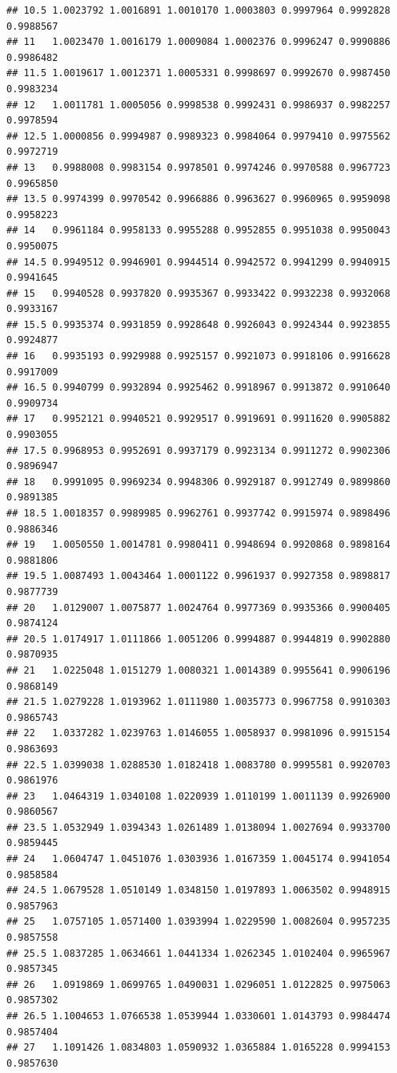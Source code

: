 \documentclass[
]{book}
\begin{document}
\begin{verbatim}
## 10.5 1.0023792 1.0016891 1.0010170 1.0003803 0.9997964 0.9992828 0.9988567
## 11   1.0023470 1.0016179 1.0009084 1.0002376 0.9996247 0.9990886 0.9986482
## 11.5 1.0019617 1.0012371 1.0005331 0.9998697 0.9992670 0.9987450 0.9983234
## 12   1.0011781 1.0005056 0.9998538 0.9992431 0.9986937 0.9982257 0.9978594
## 12.5 1.0000856 0.9994987 0.9989323 0.9984064 0.9979410 0.9975562 0.9972719
## 13   0.9988008 0.9983154 0.9978501 0.9974246 0.9970588 0.9967723 0.9965850
## 13.5 0.9974399 0.9970542 0.9966886 0.9963627 0.9960965 0.9959098 0.9958223
## 14   0.9961184 0.9958133 0.9955288 0.9952855 0.9951038 0.9950043 0.9950075
## 14.5 0.9949512 0.9946901 0.9944514 0.9942572 0.9941299 0.9940915 0.9941645
## 15   0.9940528 0.9937820 0.9935367 0.9933422 0.9932238 0.9932068 0.9933167
## 15.5 0.9935374 0.9931859 0.9928648 0.9926043 0.9924344 0.9923855 0.9924877
## 16   0.9935193 0.9929988 0.9925157 0.9921073 0.9918106 0.9916628 0.9917009
## 16.5 0.9940799 0.9932894 0.9925462 0.9918967 0.9913872 0.9910640 0.9909734
## 17   0.9952121 0.9940521 0.9929517 0.9919691 0.9911620 0.9905882 0.9903055
## 17.5 0.9968953 0.9952691 0.9937179 0.9923134 0.9911272 0.9902306 0.9896947
## 18   0.9991095 0.9969234 0.9948306 0.9929187 0.9912749 0.9899860 0.9891385
## 18.5 1.0018357 0.9989985 0.9962761 0.9937742 0.9915974 0.9898496 0.9886346
## 19   1.0050550 1.0014781 0.9980411 0.9948694 0.9920868 0.9898164 0.9881806
## 19.5 1.0087493 1.0043464 1.0001122 0.9961937 0.9927358 0.9898817 0.9877739
## 20   1.0129007 1.0075877 1.0024764 0.9977369 0.9935366 0.9900405 0.9874124
## 20.5 1.0174917 1.0111866 1.0051206 0.9994887 0.9944819 0.9902880 0.9870935
## 21   1.0225048 1.0151279 1.0080321 1.0014389 0.9955641 0.9906196 0.9868149
## 21.5 1.0279228 1.0193962 1.0111980 1.0035773 0.9967758 0.9910303 0.9865743
## 22   1.0337282 1.0239763 1.0146055 1.0058937 0.9981096 0.9915154 0.9863693
## 22.5 1.0399038 1.0288530 1.0182418 1.0083780 0.9995581 0.9920703 0.9861976
## 23   1.0464319 1.0340108 1.0220939 1.0110199 1.0011139 0.9926900 0.9860567
## 23.5 1.0532949 1.0394343 1.0261489 1.0138094 1.0027694 0.9933700 0.9859445
## 24   1.0604747 1.0451076 1.0303936 1.0167359 1.0045174 0.9941054 0.9858584
## 24.5 1.0679528 1.0510149 1.0348150 1.0197893 1.0063502 0.9948915 0.9857963
## 25   1.0757105 1.0571400 1.0393994 1.0229590 1.0082604 0.9957235 0.9857558
## 25.5 1.0837285 1.0634661 1.0441334 1.0262345 1.0102404 0.9965967 0.9857345
## 26   1.0919869 1.0699765 1.0490031 1.0296051 1.0122825 0.9975063 0.9857302
## 26.5 1.1004653 1.0766538 1.0539944 1.0330601 1.0143793 0.9984474 0.9857404
## 27   1.1091426 1.0834803 1.0590932 1.0365884 1.0165228 0.9994153 0.9857630

\end{verbatim}
\end{document}
